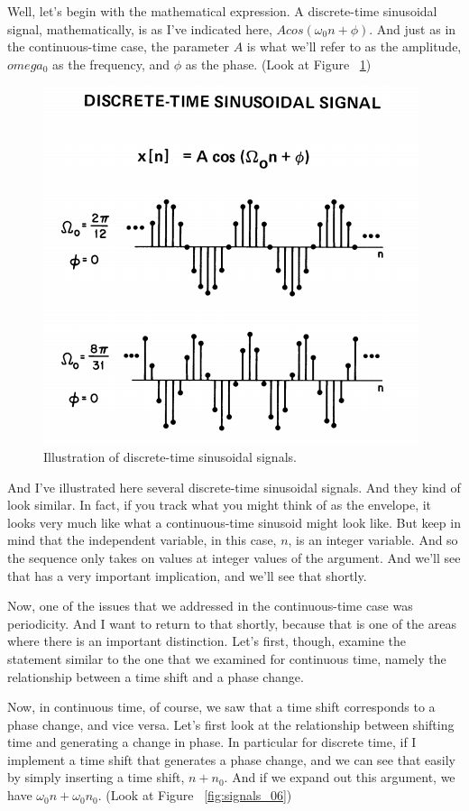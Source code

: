 \documentclass[fleqn,10pt]{olplainarticle}
\theoremstyle{definition}
\theoremstyle{remark}
\begin{document}
Well, let's begin with the mathematical expression. A discrete-time sinusoidal signal, mathematically, is as I've indicated here, $A cos(\omega_0 n + \phi)$. And just as in the continuous-time case, the parameter $A$ is what we'll refer to as the amplitude, $omega_0$ as the frequency, and $\phi$ as the phase. (Look at Figure ~\ref{fig:signals_05})

\begin{figure}[ht]
\centering
\includegraphics[width=0.5\linewidth]{images/signals_05.png}
\caption{Illustration of discrete-time sinusoidal signals.}
\label{fig:signals_05}
\end{figure}

And I've illustrated here several discrete-time sinusoidal signals. And they kind of look similar. In fact, if you track what you might think of as the envelope, it looks very much like what a continuous-time sinusoid might look like. But keep in mind that the independent variable, in this case, $n$, is an integer variable. And so the sequence only takes on values at integer values of the argument. And we'll see that has a very important implication, and we'll see that shortly.

Now, one of the issues that we addressed in the continuous-time case was periodicity. And I want to return to that shortly, because that is one of the areas where there is an important distinction. Let's first, though, examine the statement similar to the one that we examined for continuous time, namely the relationship between a time shift and a phase change.

Now, in continuous time, of course, we saw that a time shift corresponds to a phase change, and vice versa. Let's first look at the relationship between shifting time and generating a change in phase. In particular for discrete time, if I implement a time shift that generates a phase change, and we can see that easily by simply inserting a time shift, $n + n_0$. And if we expand out this argument, we have $\omega_0 n + \omega_0 n_0$. (Look at Figure ~\ref{fig:signals_06})
\end{document}

